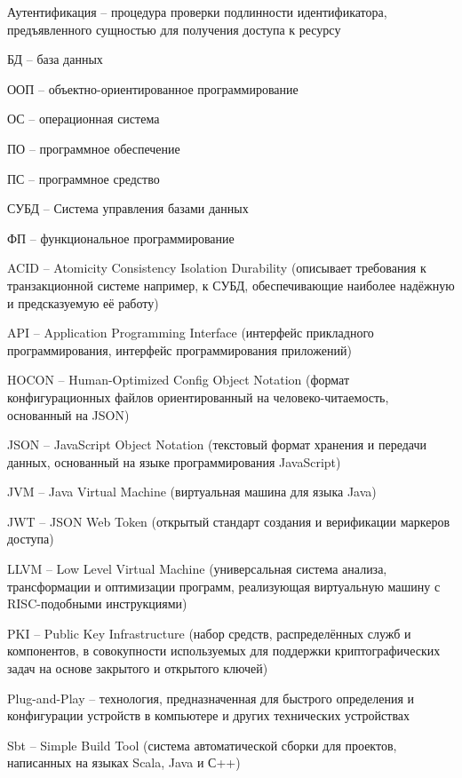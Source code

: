 
Аутентификация -- процедура проверки подлинности идентификатора, предъявленного сущностью для получения доступа к ресурсу

БД -- база данных

ООП -- объектно-ориентированное программирование

ОС -- операционная система

ПО -- программное обеспечение

ПС -- программное средство

СУБД -- Система управления базами данных

ФП -- функциональное программирование

ACID -- Atomicity Consistency Isolation Durability  (описывает требования к транзакционной системе например, к СУБД, обеспечивающие наиболее надёжную и предсказуемую её работу)

API -- Application Programming Interface (интерфейс прикладного программирования, интерфейс программирования приложений)

HOCON -- Human-Optimized Config Object Notation (формат конфигурационных файлов ориентированный на человеко-читаемость, основанный на JSON)

JSON -- JavaScript Object Notation (текстовый формат хранения и передачи данных, основанный на языке программирования JavaScript)

JVM -- Java Virtual Machine (виртуальная машина для языка Java)

JWT -- JSON Web Token (открытый стандарт создания и верификации маркеров доступа)

LLVM -- Low Level Virtual Machine (универсальная система анализа, трансформации и оптимизации программ, реализующая виртуальную машину с RISC-подобными инструкциями)

PKI -- Public Key Infrastructure (набор средств, распределённых служб и компонентов, в совокупности используемых для поддержки криптографических задач на основе закрытого и открытого ключей)

Plug-and-Play -- технология, предназначенная для быстрого определения и конфигурации устройств в компьютере и других технических устройствах

Sbt -- Simple Build Tool (система автоматической сборки для проектов, написанных на языках Scala, Java и С++)

\clearpage